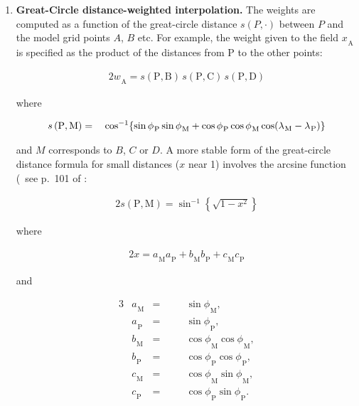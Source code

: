\documentclass[../main/NEMO_manual]{subfiles}
\begin{document}
\begin{enumerate}
\item {\bfseries Great-Circle distance-weighted interpolation.}
  The weights are computed as a function of the great-circle distance $s(P, \cdot)$ between $P$ and
  the model grid points $A$, $B$ etc.
  For example, the weight given to the field ${x_{}}_{\mathrm A}$ is specified as the product of the distances
  from ${\mathrm P}$ to the other points:

  \begin{alignat*}{2}
    {w_{}}_{\mathrm A} = s({\mathrm P}, {\mathrm B}) \, s({\mathrm P}, {\mathrm C}) \, s({\mathrm P}, {\mathrm D})
  \end{alignat*}

  where

  \begin{alignat*}{2}
    s\left({\mathrm P}, {\mathrm M} \right) & = & \hspace{0.25em} \cos^{-1} \! \left\{
               \sin {\phi_{}}_{\mathrm P} \sin {\phi_{}}_{\mathrm M}
             + \cos {\phi_{}}_{\mathrm P} \cos {\phi_{}}_{\mathrm M}
               \cos ({\lambda_{}}_{\mathrm M} - {\lambda_{}}_{\mathrm P})
                   \right\}
   \end{alignat*}

   and $M$ corresponds to $B$, $C$ or $D$.
   A more stable form of the great-circle distance formula for small distances ($x$ near 1)
   involves the arcsine function (\eg\ see p.~101 of \citet{daley.barker_bk01}:

   \begin{alignat*}{2}
     s\left( {\mathrm P}, {\mathrm M} \right) = \sin^{-1} \! \left\{ \sqrt{ 1 - x^2 } \right\}
   \end{alignat*}

   where

   \begin{alignat*}{2}
     x = {a_{}}_{\mathrm M} {a_{}}_{\mathrm P} + {b_{}}_{\mathrm M} {b_{}}_{\mathrm P} + {c_{}}_{\mathrm M} {c_{}}_{\mathrm P}
   \end{alignat*}

   and

   \begin{alignat*}{3}
   & {a_{}}_{\mathrm M} & = && \quad \sin {\phi_{}}_{\mathrm M}, \\
   & {a_{}}_{\mathrm P} & = && \quad \sin {\phi_{}}_{\mathrm P}, \\
   & {b_{}}_{\mathrm M} & = && \quad \cos {\phi_{}}_{\mathrm M} \cos {\phi_{}}_{\mathrm M}, \\
   & {b_{}}_{\mathrm P} & = && \quad \cos {\phi_{}}_{\mathrm P} \cos {\phi_{}}_{\mathrm P}, \\
   & {c_{}}_{\mathrm M} & = && \quad \cos {\phi_{}}_{\mathrm M} \sin {\phi_{}}_{\mathrm M}, \\
   & {c_{}}_{\mathrm P} & = && \quad \cos {\phi_{}}_{\mathrm P} \sin {\phi_{}}_{\mathrm P}.
   \end{alignat*}


\end{enumerate}
\end{document}
